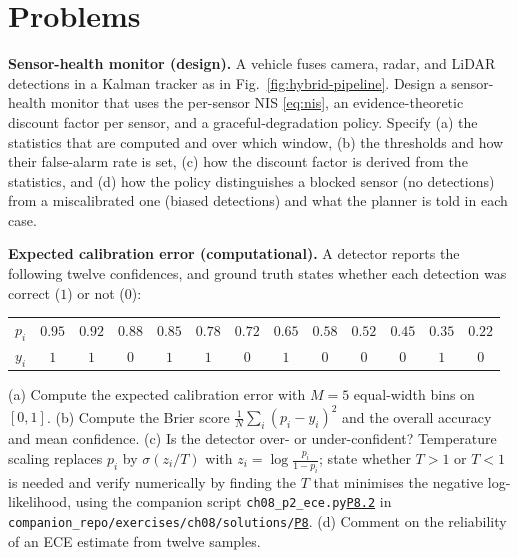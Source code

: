 \documentclass[graybox,envcountchap]{style/SNmono}
\newcommand{\problemsection}{\section*{Problems}\addcontentsline{toc}{section}{Problems}}
\newcommand{\repopath}[1]{\texttt{#1}}
\providecommand{\DIFadd}[1]{{\protect\color{blue} #1}} %
\providecommand{\DIFdel}[1]{{\protect\color{red} #1}} %
\DeclareRobustCommand{\RtwoDel}[1]{{\color{red}%
  \renewcommand{\DIFadd}[1]{##1}\renewcommand{\DIFdel}[1]{##1}%
  #1}}
\DeclareRobustCommand{\RtwoAdd}[1]{{\color{blue}#1}}
\DeclareRobustCommand{\codeentry}[1]{\hyperref[code:#1]{\texttt{#1}}}
\begin{document}
\problemsection

\begin{prob}\label{prob:ch08:1}
\textbf{Sensor-health monitor (design).} A vehicle fuses camera, radar, and LiDAR detections in a Kalman tracker as in Fig.~\ref{fig:hybrid-pipeline}. Design a sensor-health monitor that uses the per-sensor NIS \eqref{eq:nis}, an evidence-theoretic discount factor per sensor, and a graceful-degradation policy. Specify (a) the statistics that are computed and over which window, (b) the thresholds and how their false-alarm rate is set, (c) how the discount factor is derived from the statistics, and (d) how the policy distinguishes a blocked sensor (no detections) from a miscalibrated one (biased detections) and what the planner is told in each case.
\end{prob}

\begin{prob}\label{prob:ch08:2}
\textbf{Expected calibration error (computational).} A detector reports the following twelve confidences, and ground truth states whether each detection was correct ($1$) or not ($0$):
\begin{center}\scriptsize
\setlength{\tabcolsep}{3.5pt}
\begin{tabular}{l*{12}{c}}
\toprule
$p_i$ & $0.95$ & $0.92$ & $0.88$ & $0.85$ & $0.78$ & $0.72$ & $0.65$ & $0.58$ & $0.52$ & $0.45$ & $0.35$ & $0.22$ \\
$y_i$ & $1$ & $1$ & $0$ & $1$ & $1$ & $0$ & $1$ & $0$ & $0$ & $0$ & $1$ & $0$ \\
\bottomrule
\end{tabular}
\end{center}
(a) Compute the expected calibration error with $M=5$ equal-width bins on $[0,1]$. (b) Compute the Brier score $\frac{1}{N}\sum_i(p_i-y_i)^2$ and the overall accuracy and mean confidence. (c) Is the detector over- or under-confident? Temperature scaling replaces $p_i$ by $\sigma(z_i/T)$ with $z_i=\log\frac{p_i}{1-p_i}$; state whether $T>1$ or $T<1$ is needed and verify numerically by finding the $T$ that minimises the negative log-likelihood, using the companion script \RtwoDel{\repopath{ch08\_\allowbreak p2\_\allowbreak ece.py}}\RtwoAdd{\codeentry{P8.2}} in \RtwoDel{\repopath{companion\_\allowbreak repo/\allowbreak exercises/\allowbreak ch08/\allowbreak solutions/\allowbreak }}\RtwoAdd{\codeentry{P8}}. (d) Comment on the reliability of an ECE estimate from twelve samples.
\end{prob}
\end{document}
